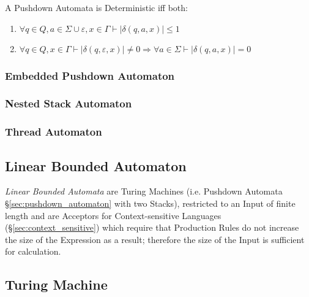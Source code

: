 A Pushdown Automata is Deterministic iff both:
\begin{enumerate}
\item $\forall q \in Q, a \in \Sigma \cup {\varepsilon}, x \in
  \Gamma \vdash |\delta(q,a,x)| \leq 1$
\item $\forall q \in Q, x \in \Gamma \vdash |\delta(q,\varepsilon,x)|
  \neq 0 \Rightarrow \forall a \in \Sigma \vdash |\delta(q,a,x)|=0$
\end{enumerate}



\subsubsection{Embedded Pushdown Automaton}\label{sec:embedded_pushdown}

\subsubsection{Nested Stack Automaton}\label{sec:nested_stack_automaton}

\subsubsection{Thread Automaton}\label{sec:thread_automaton}



\subsection{Linear Bounded Automaton} \label{sec:linear_bounded_automaton}

\emph{Linear Bounded Automata} are Turing Machines (i.e. Pushdown Automata
\S\ref{sec:pushdown_automaton} with two Stacks), restricted to an Input of
finite length and are Acceptors for Context-sensitive Languages
(\S\ref{sec:context_sensitive}) which require that Production Rules do not
increase the size of the Expression as a result; therefore the size of the Input
is sufficient for calculation.



\subsection{Turing Machine}\label{sec:turing_machine}

